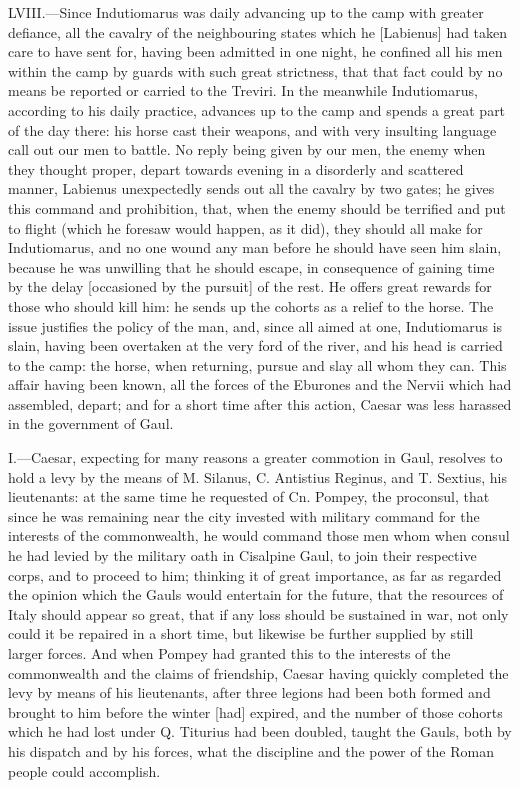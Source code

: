 LVIII.—Since Indutiomarus was daily advancing up to the camp with
greater defiance, all the cavalry of the neighbouring states which he
[Labienus] had taken care to have sent for, having been admitted in one
night, he confined all his men within the camp by guards with such great
strictness, that that fact could by no means be reported or carried to
the Treviri. In the meanwhile Indutiomarus, according to his daily
practice, advances up to the camp and spends a great part of the day
there: his horse cast their weapons, and with very insulting language
call out our men to battle. No reply being given by our men, the enemy
when they thought proper, depart towards evening in a disorderly and
scattered manner, Labienus unexpectedly sends out all the cavalry by two
gates; he gives this command and prohibition, that, when the enemy
should be terrified and put to flight (which he foresaw would happen, as
it did), they should all make for Indutiomarus, and no one wound any man
before he should have seen him slain, because he was unwilling that he
should escape, in consequence of gaining time by the delay [occasioned
by the pursuit] of the rest. He offers great rewards for those who
should kill him: he sends up the cohorts as a relief to the horse. The
issue justifies the policy of the man, and, since all aimed at one,
Indutiomarus is slain, having been overtaken at the very ford of the
river, and his head is carried to the camp: the horse, when returning,
pursue and slay all whom they can. This affair having been known, all
the forces of the Eburones and the Nervii which had assembled, depart;
and for a short time after this action, Caesar was less harassed in the
government of Gaul.


I.—Caesar, expecting for many reasons a greater commotion in Gaul,
resolves to hold a levy by the means of M. Silanus, C. Antistius
Reginus, and T. Sextius, his lieutenants: at the same time he requested
of Cn. Pompey, the proconsul, that since he was remaining near the city
invested with military command for the interests of the commonwealth, he
would command those men whom when consul he had levied by the military
oath in Cisalpine Gaul, to join their respective corps, and to proceed
to him; thinking it of great importance, as far as regarded the opinion
which the Gauls would entertain for the future, that the resources of
Italy should appear so great, that if any loss should be sustained in
war, not only could it be repaired in a short time, but likewise be
further supplied by still larger forces. And when Pompey had granted
this to the interests of the commonwealth and the claims of friendship,
Caesar having quickly completed the levy by means of his lieutenants,
after three legions had been both formed and brought to him before the
winter [had] expired, and the number of those cohorts which he had lost
under Q. Titurius had been doubled, taught the Gauls, both by his
dispatch and by his forces, what the discipline and the power of the
Roman people could accomplish.

